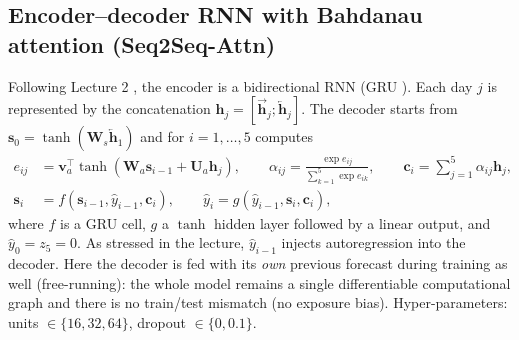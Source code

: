 \documentclass[11pt,a4paper]{article}
\newcommand{\yhat}{\hat{y}}
\begin{document}
\subsection{Encoder--decoder RNN with Bahdanau attention (Seq2Seq-Attn)}
Following Lecture 2 \cite{bahdanau2015}, the encoder is a bidirectional RNN (GRU \cite{cho2014}). Each day $j$ is represented by the concatenation $\mathbf h_j=[\overrightarrow{\mathbf h}_j;\overleftarrow{\mathbf h}_j]$. The decoder starts from $\mathbf s_0=\tanh(\mathbf W_s\overleftarrow{\mathbf h}_1)$ and for $i=1,\dots,5$ computes
\begin{align}
  e_{ij}&=\mathbf v_a^{\top}\tanh(\mathbf W_a\mathbf s_{i-1}+\mathbf U_a\mathbf h_j),\qquad
  \alpha_{ij}=\frac{\exp e_{ij}}{\sum_{k=1}^{5}\exp e_{ik}},\qquad
  \mathbf c_i=\sum_{j=1}^{5}\alpha_{ij}\mathbf h_j,\\
  \mathbf s_i&=f(\mathbf s_{i-1},\yhat_{i-1},\mathbf c_i),\qquad
  \yhat_i=g(\yhat_{i-1},\mathbf s_i,\mathbf c_i),
\end{align}
where $f$ is a GRU cell, $g$ a $\tanh$ hidden layer followed by a linear output, and $\yhat_0=z_5=0$. As stressed in the lecture, $\yhat_{i-1}$ injects autoregression into the decoder. Here the decoder is fed with its \emph{own} previous forecast during training as well (free-running): the whole model remains a single differentiable computational graph and there is no train/test mismatch (no exposure bias). Hyper-parameters: units $\in\{16,32,64\}$, dropout $\in\{0,0.1\}$.
\end{document}
